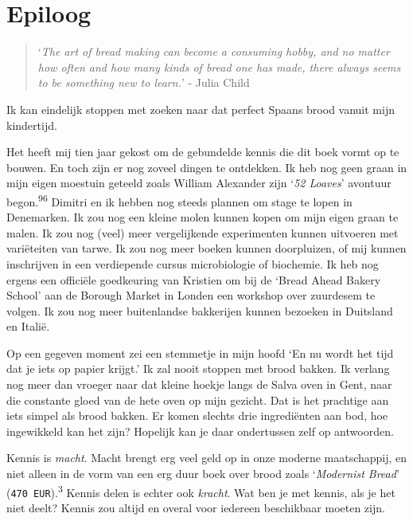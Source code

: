\documentclass[
  11pt,
  dutch,
]{memoir}
\begin{document}
\backmatter

\hypertarget{epiloog}{%
\chapter{Epiloog}\label{epiloog}}

\begin{quote}
`\emph{The art of bread making can become a consuming hobby, and no
matter how often and how many kinds of bread one has made, there always
seems to be something new to learn.}' - Julia Child
\end{quote}

Ik kan eindelijk stoppen met zoeken naar dat perfect Spaans brood vanuit
mijn kindertijd.

Het heeft mij tien jaar gekost om de gebundelde kennis die dit boek
vormt op te bouwen. En toch zijn er nog zoveel dingen te ontdekken. Ik
heb nog geen graan in mijn eigen moestuin geteeld zoals William
Alexander zijn `\emph{52 Loaves}' avontuur begon.\textsuperscript{96}
Dimitri en ik hebben nog steeds plannen om stage te lopen in Denemarken.
Ik zou nog een kleine molen kunnen kopen om mijn eigen graan te malen.
Ik zou nog (veel) meer vergelijkende experimenten kunnen uitvoeren met
variëteiten van tarwe. Ik zou nog meer boeken kunnen doorpluizen, of mij
kunnen inschrijven in een verdiepende cursus microbiologie of biochemie.
Ik heb nog ergens een officiële goedkeuring van Kristien om bij de
`Bread Ahead Bakery School' aan de Borough Market in Londen een workshop
over zuurdesem te volgen. Ik zou nog meer buitenlandse bakkerijen kunnen
bezoeken in Duitsland en Italië.

Op een gegeven moment zei een stemmetje in mijn hoofd `En nu wordt het
tijd dat je iets op papier krijgt.' Ik zal nooit stoppen met brood
bakken. Ik verlang nog meer dan vroeger naar dat kleine hoekje langs de
Salva oven in Gent, naar die constante gloed van de hete oven op mijn
gezicht. Dat is het prachtige aan iets simpel als brood bakken. Er komen
slechts drie ingrediënten aan bod, hoe ingewikkeld kan het zijn?
Hopelijk kan je daar ondertussen zelf op antwoorden.

Kennis is \emph{macht}. Macht brengt erg veel geld op in onze moderne
maatschappij, en niet alleen in de vorm van een erg duur boek over brood
zoals `\emph{Modernist Bread}' (\texttt{470\ EUR}).\textsuperscript{3}
Kennis delen is echter ook \emph{kracht}. Wat ben je met kennis, als je
het niet deelt? Kennis zou altijd en overal voor iedereen beschikbaar
moeten zijn.
\end{document}
